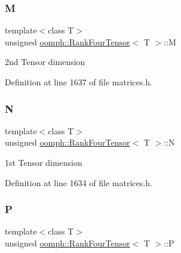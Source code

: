 \subsubsection{\texorpdfstring{M}{M}}
{\footnotesize\ttfamily template$<$class T$>$ \\
unsigned \hyperlink{classoomph_1_1RankFourTensor}{oomph\+::\+Rank\+Four\+Tensor}$<$ T $>$\+::M\hspace{0.3cm}{\ttfamily [private]}}



2nd Tensor dimension 



Definition at line 1637 of file matrices.\+h.

\mbox{\label{classoomph_1_1RankFourTensor_a122b61b1b83d3a8df6976e735b89244c}} 
\subsubsection{\texorpdfstring{N}{N}}
{\footnotesize\ttfamily template$<$class T$>$ \\
unsigned \hyperlink{classoomph_1_1RankFourTensor}{oomph\+::\+Rank\+Four\+Tensor}$<$ T $>$\+::N\hspace{0.3cm}{\ttfamily [private]}}



1st Tensor dimension 



Definition at line 1634 of file matrices.\+h.

\mbox{\label{classoomph_1_1RankFourTensor_ad7c18005b6cb68643c2718e67dd6a0d7}} 
\subsubsection{\texorpdfstring{P}{P}}
{\footnotesize\ttfamily template$<$class T$>$ \\
unsigned \hyperlink{classoomph_1_1RankFourTensor}{oomph\+::\+Rank\+Four\+Tensor}$<$ T $>$\+::P\hspace{0.3cm}{\ttfamily [private]}}



